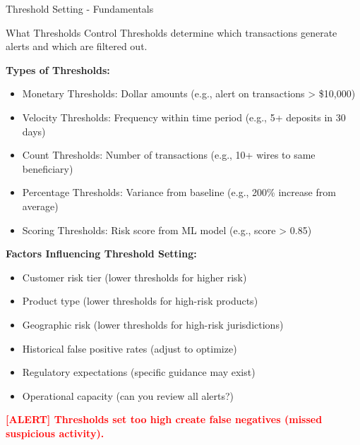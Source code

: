 \documentclass[11pt,a4paper]{beamer}
\newcommand{\redflag}[1]{\textcolor{red}{\textbf{[ALERT] #1}}}
\begin{document}
	\begin{frame}{Threshold Setting - Fundamentals}
		\begin{block}{What Thresholds Control}
			Thresholds determine which transactions generate alerts and which are filtered out.
		\end{block}
		
		\textbf{Types of Thresholds:}
		\begin{itemize}
			\item Monetary Thresholds: Dollar amounts (e.g., alert on transactions > \$10,000)
			\item Velocity Thresholds: Frequency within time period (e.g., 5+ deposits in 30 days)
			\item Count Thresholds: Number of transactions (e.g., 10+ wires to same beneficiary)
			\item Percentage Thresholds: Variance from baseline (e.g., 200\% increase from average)
			\item Scoring Thresholds: Risk score from ML model (e.g., score > 0.85)
		\end{itemize}
		
		\textbf{Factors Influencing Threshold Setting:}
		\begin{itemize}
			\item Customer risk tier (lower thresholds for higher risk)
			\item Product type (lower thresholds for high-risk products)
			\item Geographic risk (lower thresholds for high-risk jurisdictions)
			\item Historical false positive rates (adjust to optimize)
			\item Regulatory expectations (specific guidance may exist)
			\item Operational capacity (can you review all alerts?)
		\end{itemize}
		
		\redflag{Thresholds set too high create false negatives (missed suspicious activity).}
	\end{frame}
	
\end{document}

